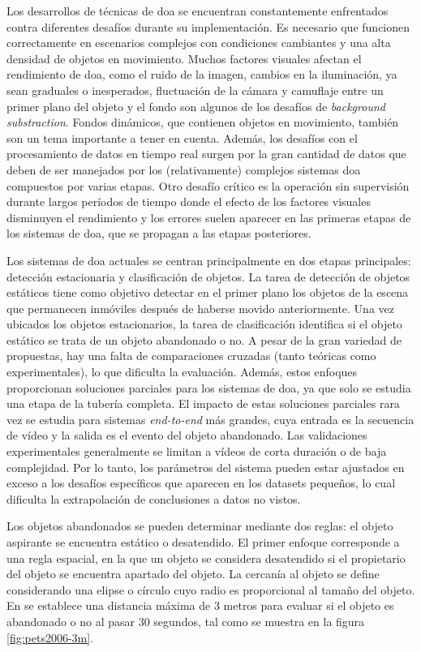Los desarrollos de técnicas de \gls{doa} se encuentran constantemente enfrentados contra diferentes desafíos durante su implementación. Es necesario que funcionen correctamente en escenarios complejos con condiciones cambiantes y una alta densidad de objetos en movimiento. Muchos factores visuales afectan el rendimiento de \gls{doa}, como el ruido de la imagen, cambios en la iluminación, ya sean graduales o inesperados, fluctuación de la cámara y camuflaje entre un primer plano del objeto y el fondo son algunos de los desafíos de \textit{background substraction}. Fondos dinámicos, que contienen objetos en movimiento, también son un tema importante a tener en cuenta. Además, los desafíos con el procesamiento de datos en tiempo real surgen por la gran cantidad de datos que deben de ser manejados por los (relativamente) complejos sistemas \gls{doa} compuestos por varias etapas. Otro desafío crítico es la operación sin supervisión durante largos períodos de tiempo donde el efecto de los factores visuales disminuyen el rendimiento y los errores suelen aparecer en las primeras etapas de los sistemas de \gls{doa}, que se propagan a las etapas posteriores.

Los sistemas de \gls{doa} actuales se centran principalmente en dos etapas principales: detección estacionaria y clasificación de objetos. La tarea de detección de objetos estáticos tiene como objetivo detectar en el primer plano los objetos de la escena que permanecen inmóviles después de haberse movido anteriormente. Una vez ubicados los objetos estacionarios, la tarea de clasificación identifica si el objeto estático se trata de un objeto abandonado o no. A pesar de la gran variedad de propuestas, hay una falta de comparaciones cruzadas (tanto teóricas como experimentales), lo que dificulta la evaluación. Además, estos enfoques proporcionan soluciones parciales para los sistemas de \gls{doa}, ya que solo se estudia una etapa de la tubería completa. El impacto de estas soluciones parciales rara vez se estudia para sistemas \textit{end-to-end} más grandes, cuya entrada es la secuencia de vídeo y la salida es el evento del objeto abandonado. Las validaciones experimentales generalmente se limitan a vídeos de corta duración o de baja complejidad. Por lo tanto, los parámetros del sistema pueden estar ajustados en exceso a los desafíos específicos que aparecen en los datasets pequeños, lo cual dificulta la extrapolación de conclusiones a datos no vistos.

Los objetos abandonados se pueden determinar mediante dos reglas: el objeto aspirante se encuentra estático o desatendido. El primer enfoque corresponde a una regla espacial, en la que un objeto se considera desatendido si el propietario del objeto se encuentra apartado del objeto. La cercanía al objeto se define considerando una elipse o círculo cuyo radio es proporcional al tamaño del objeto. En \cite{Lv06leftluggage} se establece una distancia máxima de 3 metros para evaluar si el objeto es abandonado o no al pasar 30 segundos, tal como se muestra en la figura \ref{fig:pets2006-3m}.

